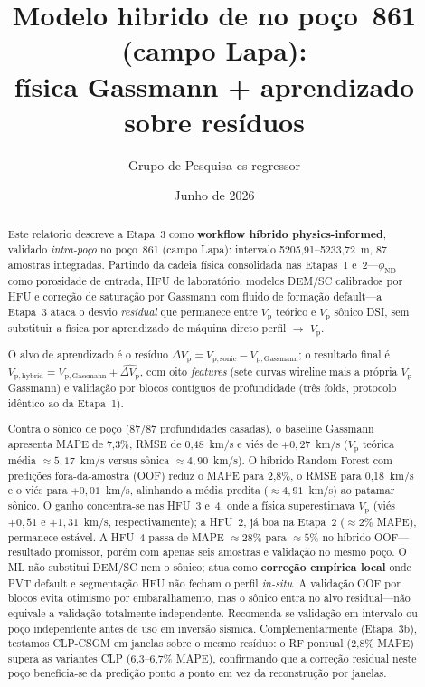 \documentclass[11pt,a4paper]{article}
\title{%
  Modelo hibrido de \Vp{} no poço~861 (campo Lapa):\\
  física Gassmann + aprendizado sobre resíduos
}
\author{Grupo de Pesquisa cs-regressor}
\date{Junho de 2026}
\numberwithin{equation}{section}
\newcommand{\Vp}{\ensuremath{V_{\mathrm{p}}}}
\newcommand{\phiND}{\ensuremath{\phi_{\mathrm{ND}}}}
\begin{document}
\maketitle

\begin{abstract}
Este relatorio descreve a Etapa~3 como \textbf{workflow híbrido
physics-informed}, validado \emph{intra-poço} no poço~861 (campo Lapa):
intervalo 5205,91--5233,72~m, 87 amostras integradas.
Partindo da cadeia física consolidada nas Etapas~1 e~2---\phiND{} como
porosidade de entrada, HFU de laboratório, modelos DEM/SC calibrados por HFU
e correção de saturação por Gassmann com fluido de formação
default---a Etapa~3 ataca o desvio \emph{residual} que permanece entre \Vp{}
teórico e \Vp{} sônico DSI, sem substituir a física por aprendizado de
máquina direto perfil $\rightarrow$ \Vp{}.

O alvo de aprendizado é o resíduo
$\Delta V_{\mathrm{p}} = V_{\mathrm{p,sonic}} - V_{\mathrm{p,Gassmann}}$;
o resultado final é
$V_{\mathrm{p,hybrid}} = V_{\mathrm{p,Gassmann}} + \widehat{\Delta V_{\mathrm{p}}}$,
com oito \emph{features} (sete curvas wireline mais a própria \Vp{} Gassmann)
e validação por blocos contíguos de profundidade (três folds, protocolo
idêntico ao da Etapa~1).

Contra o sônico de poço (87/87 profundidades casadas), o baseline Gassmann
apresenta MAPE de 7,3\%, RMSE de 0,48~km/s e viés de $+0{,}27$~km/s
(\Vp{} teórica média $\approx 5{,}17$~km/s versus sônica $\approx 4{,}90$~km/s).
O híbrido Random Forest com predições fora-da-amostra (OOF) reduz o MAPE
para 2,8\%, o RMSE para 0,18~km/s e o viés para $+0{,}01$~km/s, alinhando a
média predita ($\approx 4{,}91$~km/s) ao patamar sônico.
O ganho concentra-se nas HFU~3 e~4, onde a física superestimava \Vp{}
(viés $+0{,}51$ e $+1{,}31$~km/s, respectivamente); a HFU~2, já boa na
Etapa~2 ($\approx 2\%$ MAPE), permanece estável.
A HFU~4 passa de MAPE $\approx 28\%$ para $\approx 5\%$ no híbrido OOF---resultado
promissor, porém com apenas seis amostras e validação no mesmo poço.
O ML não substitui DEM/SC nem o sônico; atua como \textbf{correção
empírica local} onde PVT default e segmentação HFU não fecham o perfil
\emph{in-situ}.
A validação OOF por blocos evita otimismo por embaralhamento, mas o
sônico entra no alvo residual---não equivale a validação totalmente
independente.
Recomenda-se validação em intervalo ou poço independente antes de uso
em inversão sísmica.
Complementarmente (Etapa~3b), testamos CLP-CSGM em janelas sobre o mesmo
resíduo: o RF pontual (2,8\% MAPE) supera as variantes CLP
(6,3--6,7\% MAPE), confirmando que a correção residual neste poço
beneficia-se da predição ponto a ponto em vez da reconstrução por janelas.
\end{abstract}
\end{document}
